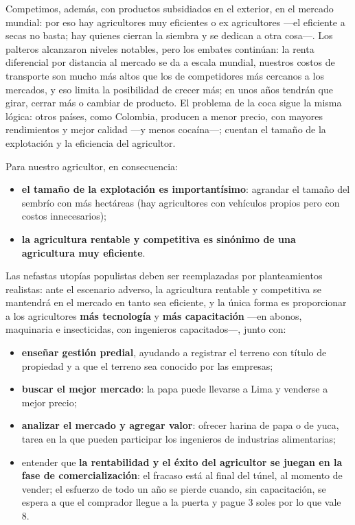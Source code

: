 \documentclass[
  man,
  floatsintext,
  longtable,
  a4paper,
  nolmodern,
  notxfonts,
  notimes,
  12pt,
  colorlinks=true,linkcolor=blue,citecolor=blue,urlcolor=blue]{apa7}
\providecommand{\tightlist}{%
  \setlength{\itemsep}{0pt}\setlength{\parskip}{0pt}}
\begin{document}
Competimos, además, con productos subsidiados en el exterior, en el
mercado mundial: por eso hay agricultores muy eficientes o ex
agricultores ---el eficiente a secas no basta; hay quienes cierran la
siembra y se dedican a otra cosa---. Los palteros alcanzaron niveles
notables, pero los embates continúan: la renta diferencial por distancia
al mercado se da a escala mundial, nuestros costos de transporte son
mucho más altos que los de competidores más cercanos a los mercados, y
eso limita la posibilidad de crecer más; en unos años tendrán que girar,
cerrar más o cambiar de producto. El problema de la coca sigue la misma
lógica: otros países, como Colombia, producen a menor precio, con
mayores rendimientos y mejor calidad ---y menos cocaína---; cuentan el
tamaño de la explotación y la eficiencia del agricultor.

Para nuestro agricultor, en consecuencia:

\begin{itemize}
\tightlist
\item
  \textbf{el tamaño de la explotación es importantísimo}: agrandar el
  tamaño del sembrío con más hectáreas (hay agricultores con vehículos
  propios pero con costos innecesarios);
\item
  \textbf{la agricultura rentable y competitiva es sinónimo de una
  agricultura muy eficiente}.
\end{itemize}

Las nefastas utopías populistas deben ser reemplazadas por
planteamientos realistas: ante el escenario adverso, la agricultura
rentable y competitiva se mantendrá en el mercado en tanto sea
eficiente, y la única forma es proporcionar a los agricultores
\textbf{más tecnología} y \textbf{más capacitación} ---en abonos,
maquinaria e insecticidas, con ingenieros capacitados---, junto con:

\begin{itemize}
\tightlist
\item
  \textbf{enseñar gestión predial}, ayudando a registrar el terreno con
  título de propiedad y a que el terreno sea conocido por las empresas;
\item
  \textbf{buscar el mejor mercado}: la papa puede llevarse a Lima y
  venderse a mejor precio;
\item
  \textbf{analizar el mercado y agregar valor}: ofrecer harina de papa o
  de yuca, tarea en la que pueden participar los ingenieros de
  industrias alimentarias;
\item
  entender que \textbf{la rentabilidad y el éxito del agricultor se
  juegan en la fase de comercialización}: el fracaso está al final del
  túnel, al momento de vender; el esfuerzo de todo un año se pierde
  cuando, sin capacitación, se espera a que el comprador llegue a la
  puerta y pague 3 soles por lo que vale 8.
\end{itemize}
\end{document}
